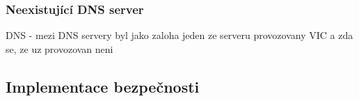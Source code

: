 \subsubsection{Neexistující DNS server}
DNS - mezi DNS servery byl jako zaloha jeden ze serveru provozovany VIC a zda se, ze uz provozovan neni

\subsection{Implementace bezpečnosti}



% 
% 
